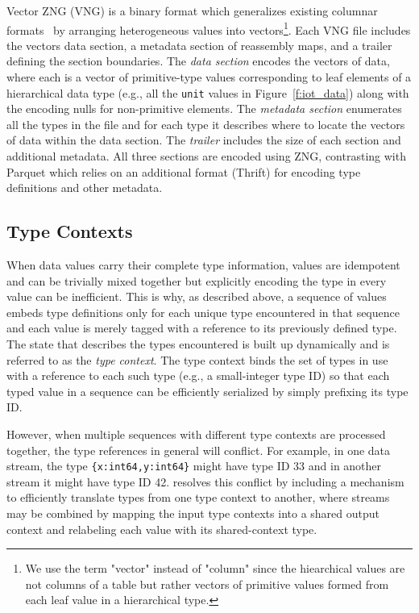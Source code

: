  Vector ZNG (VNG) is a binary format which generalizes existing columnar formats~ by arranging heterogeneous values into vectors\footnote{We use the term "vector" instead of "column" since the hiearchical values are not columns of a table but rather vectors of primitive values formed from each leaf value in a hierarchical type.}. Each VNG file includes the vectors data section, a metadata section of reassembly maps, and a trailer defining the section boundaries. The {\em data section} encodes the vectors of data, where each is a vector of primitive-type values corresponding to leaf elements of a hierarchical data type (e.g., all the \texttt{unit} values in Figure~\ref{f:iot_data}) along with the encoding nulls for non-primitive elements. The {\em metadata section} enumerates all the types in the file and for each type it describes where to locate the vectors of data within the data section. The {\em trailer} includes the size of each section and additional metadata. All three sections are encoded using ZNG, contrasting with Parquet which relies on an additional format (Thrift) for encoding type definitions and other metadata.


\subsection{ Type Contexts} \label{ss:zed_type_contexts}

When data values carry their complete type information, values are idempotent and can be trivially mixed together but explicitly encoding the type in every value can be inefficient.  This is why, as described above, a sequence of \sys{} values embeds type definitions only for each unique type encountered in that sequence and each value is merely tagged with a reference to its previously defined type.  The state that describes the types encountered is built up dynamically and is referred to as the {\em type context}.  The type context binds the set of types in use with a reference to each such type (e.g., a small-integer type ID) so that each typed value in a sequence can be efficiently serialized by simply prefixing its type ID.

However, when multiple sequences with different type contexts are processed together, the type references in general will conflict.  For example, in one data stream, the type \texttt{\{x:int64,y:int64\}} might have type ID 33 and in another stream it might have type ID 42.  \sys{} resolves this conflict by including a mechanism to efficiently translate types from one type context to another, where streams may be combined by mapping the input type contexts into a shared output context and relabeling each value with its shared-context type.

